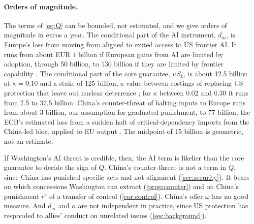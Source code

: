 \paragraph{Orders of magnitude.} The terms of \cref{eq:Q} can be bounded, not estimated, and we give orders of magnitude in euros a year. The conditional part of the AI instrument, $d_{ai}$, is Europe's loss from moving from aligned to exited access to US frontier AI. It runs from about EUR 4 billion if European gains from AI are limited by adoption, through 50 billion, to 130 billion if they are limited by frontier capability \citep{acemoglu2024simple, filippucci2025g7, epoch2026eci}. The conditional part of the core guarantee, $\kappa S_k$, is about 12.5 billion at $\kappa=0.10$ and a stake of 125 billion, a value between costings of replacing US protection that leave out nuclear deterrence \citep{iiss2025defending, burilkov2025defending}; for $\kappa$ between 0.02 and 0.30 it runs from 2.5 to 37.5 billion. China's counter-threat of halting inputs to Europe runs from about 3 billion, our assumption for graduated punishment, to 77 billion, the ECB's estimated loss from a sudden halt of critical-dependency imports from the China-led bloc, applied to EU output \citep{attinasi2025hidden}. The midpoint of 15 billion is geometric, not an estimate.

If Washington's AI threat is credible, then, the AI term is likelier than the core guarantee to decide the sign of $Q$. China's counter-threat is not a term in $Q$, since China has punished specific acts and not alignment (\cref{sec:security}). It bears on which concessions Washington can extract (\cref{prop:counter}) and on China's punishment $r^c$ of a transfer of control (\cref{cor:control}). China's offer $\omega$ has no good measure. And $d_{ai}$ and $\kappa$ are not independent in practice, since US protection has responded to allies' conduct on unrelated issues (\cref{sec:background}).

